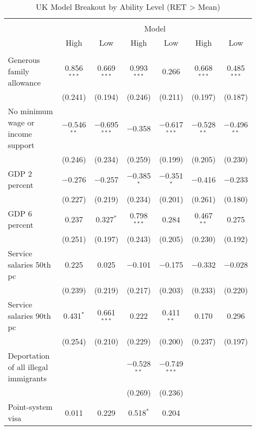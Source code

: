 
\begin{sidewaystable}[!htbp] \centering 
  \caption{UK Model Breakout by Ability Level (RET > Mean)} 
  \label{tab:uk_ability} 
\begin{tabular}{@{\extracolsep{5pt}}lcccccc} 
\\[-1.8ex]\hline 
\hline \\[-1.8ex] 
 & \multicolumn{6}{c}{Model} \\ 
\cline{2-7} 
 & High & Low & High & Low & High & Low \\ 
\hline \\[-1.8ex] 
 Generous family allowance & 0.856$^{***}$ & 0.669$^{***}$ & 0.993$^{***}$ & 0.266 & 0.668$^{***}$ & 0.485$^{***}$ \\ 
  & (0.241) & (0.194) & (0.246) & (0.211) & (0.197) & (0.187) \\ 
  No minimum wage or income support & $-$0.546$^{**}$ & $-$0.695$^{***}$ & $-$0.358 & $-$0.617$^{***}$ & $-$0.528$^{**}$ & $-$0.496$^{**}$ \\ 
  & (0.246) & (0.234) & (0.259) & (0.199) & (0.205) & (0.230) \\ 
  GDP 2 percent & $-$0.276 & $-$0.257 & $-$0.385$^{*}$ & $-$0.351$^{*}$ & $-$0.416 & $-$0.233 \\ 
  & (0.227) & (0.219) & (0.234) & (0.201) & (0.261) & (0.180) \\ 
  GDP 6 percent & 0.237 & 0.327$^{*}$ & 0.798$^{***}$ & 0.284 & 0.467$^{**}$ & 0.275 \\ 
  & (0.251) & (0.197) & (0.243) & (0.205) & (0.230) & (0.192) \\ 
  Service salaries 50th pc & 0.225 & 0.025 & $-$0.101 & $-$0.175 & $-$0.332 & $-$0.028 \\ 
  & (0.239) & (0.219) & (0.217) & (0.203) & (0.233) & (0.220) \\ 
  Service salaries 90th pc & 0.431$^{*}$ & 0.661$^{***}$ & 0.222 & 0.411$^{**}$ & 0.170 & 0.296 \\ 
  & (0.254) & (0.210) & (0.229) & (0.200) & (0.237) & (0.197) \\ 
  Deportation of all illegal immigrants &  &  & $-$0.528$^{**}$ & $-$0.749$^{***}$ &  &  \\ 
  &  &  & (0.269) & (0.236) &  &  \\ 
  Point-system visa & 0.011 & 0.229 & 0.518$^{*}$ & 0.204 &  &  \\ 

\end{tabular}
\end{sidewaystable}
